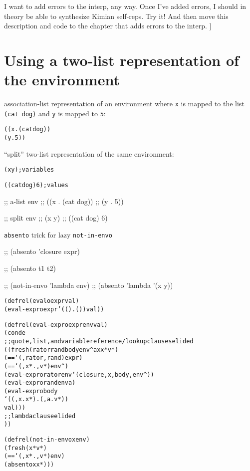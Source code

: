 \documentclass{book}
\begin{document}
I want to add errors to the interp, any way.  Once I've added errors, I should in theory be able to synthesize Kimian self-reps.  Try it!  And then move this description and code to the chapter that adds errors to the interp.
]


\chapter{Using a two-list representation of the environment}%

association-list representation of an environment where \verb|x| is mapped to the list \verb|(cat dog)| and \verb|y| is mapped to \verb|5|:
\begin{alltt}
((x . (cat dog))
 (y . 5))
\end{alltt}
  
``split'' two-list representation of the same environment:
\begin{alltt}
(x y) ; variables

((cat dog) 6) ; values
\end{alltt}

;; a-list env
;; ((x . (cat dog))
;;  (y . 5))

;; split env
;; (x y)
;; ((cat dog) 6)

\verb|absento| trick for lazy \verb|not-in-envo|

;; (absento 'closure expr)

;; (absento t1 t2)

;; (not-in-envo 'lambda env)
;; (absento 'lambda '(x y))

\begin{alltt}
(defrel (evalo expr val)
  (eval-expro expr '(() . ()) val))
\end{alltt}

\begin{alltt}  
(defrel (eval-expro expr env val)
  (conde
    ;; quote, list, and variable reference/lookup clauses elided
    ((fresh (rator rand body env^ a x x* v*)
       (== `(,rator ,rand) expr)
       (== `(,x* . ,v*) env^)
       (eval-expro rator env `(closure ,x ,body ,env^))
       (eval-expro rand env a)
       (eval-expro body
                  `((,x . x*) . (,a . v*))
                  val)))
    ;; lambda clause elided
    ))
\end{alltt}

\begin{alltt}
(defrel (not-in-envo x env)
  (fresh (x* v*)
    (== `(,x* . ,v*) env)
    (absento x x*)))
\end{alltt}
\end{document}
